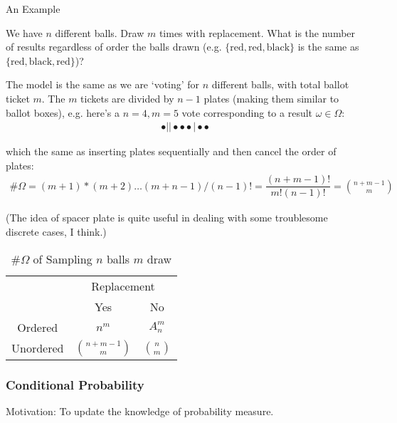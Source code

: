 \begin{point}
    An Example 
\end{point}

    We have $ n $ different balls. Draw $ m $ times with replacement. What is the number of results regardless of order the balls drawn (e.g. $ \{\mathrm{red,red,black} \} $ is the same as $ \{\mathrm{red,black,red} \} $)? 

    The model is the same as we are `voting' for $ n $ different balls, with total ballot ticket $ m $. The $ m $ tickets are divided by $ n-1 $ plates (making them similar to ballot boxes), e.g. here's a $ n=4,m=5 $ vote corresponding to a result $ \omega \in\Omega  $:
    \begin{align}
         \bullet  \big|  \big| \bullet \bullet \bullet \big|  \bullet \bullet 
    \end{align}

    which the same as inserting plates sequentially and then cancel the order of plates:
    \begin{align}
        \# \Omega  = (m+1)*(m+2)\ldots (m+n-1)\bigg/ (n-1)! = \dfrac{(n+m-1)!}{m!(n-1)!}=\binom{n+m-1}{m}
    \end{align}

    (The idea of spacer plate is quite useful in dealing with some troublesome discrete cases, I think.)
    
    \begin{table}[H]
        \centering
        \renewcommand\arraystretch{1}
        \caption{$ \# \Omega  $ of Sampling $ n $ balls $ m $ draw}
        \begin{tabular}{ccc}
            \hline
            \hline
            &\multicolumn{2}{c}{Replacement}\\
            \cline{2-3}
            &Yes&No\\
            \hline
            Ordered&$ n^m $&$ A_{n}^m $\\
            Unordered&$ \binom{n+m-1}{m} $&$ \binom{n}{m} $\\
            \hline
            \hline
        \end{tabular}
        \label{}
    \end{table}


    
    
    


\subsubsection{Conditional Probability}
    Motivation: To update the knowledge of probability measure.

